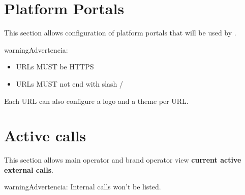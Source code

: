 \documentclass[letterpaper,10pt,spanish]{sphinxmanual}
\begin{document}
\section{Platform Portals}
\label{administration_portal/platform/portals:portals}\label{administration_portal/platform/portals:platform-portals}\label{administration_portal/platform/portals::doc}
This section allows configuration of platform portals that will be used by {\hyperref[administration_portal/platform/main_operators:main\string-operators]{}}.

\begin{notice}{warning}{Advertencia:}\begin{itemize}
\item {} 
URLs MUST be HTTPS

\item {} 
URLs MUST not end with slash /

\end{itemize}
\end{notice}

Each URL can also configure a logo and a theme per URL.


\section{Active calls}
\label{administration_portal/platform/active_calls::doc}\label{administration_portal/platform/active_calls:active-calls}
This section allows main operator and brand operator view \textbf{current active external calls}.

\begin{notice}{warning}{Advertencia:}
Internal calls won't be listed.
\end{notice}
\end{document}
